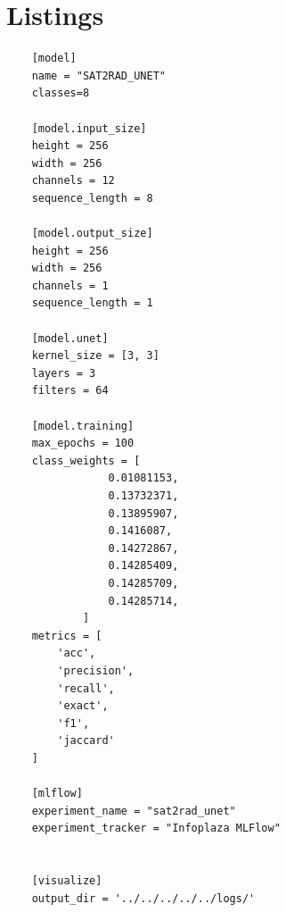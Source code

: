 \documentclass[acmtog, authorversion]{acmart}
\begin{document}
\section{Listings}
\begin{listing}
  \begin{verbatim}
    [model]
    name = "SAT2RAD_UNET"
    classes=8
    
    [model.input_size]
    height = 256
    width = 256
    channels = 12
    sequence_length = 8
    
    [model.output_size]
    height = 256
    width = 256
    channels = 1
    sequence_length = 1
    
    [model.unet]
    kernel_size = [3, 3]
    layers = 3
    filters = 64
    
    [model.training]
    max_epochs = 100
    class_weights = [
                0.01081153,
                0.13732371,
                0.13895907,
                0.1416087,
                0.14272867,
                0.14285409,
                0.14285709,
                0.14285714,
            ]
    metrics = [
        'acc',
        'precision',
        'recall',
        'exact',
        'f1', 
        'jaccard'
    ]
    
    [mlflow]
    experiment_name = "sat2rad_unet"
    experiment_tracker = "Infoplaza MLFlow"
    
    
    [visualize]
    output_dir = '../../../../../logs/'
  \end{verbatim}
  \caption{toml configuration file for U-Net Model.}
  \label{lst:hello}
\end{listing}
\end{document}
